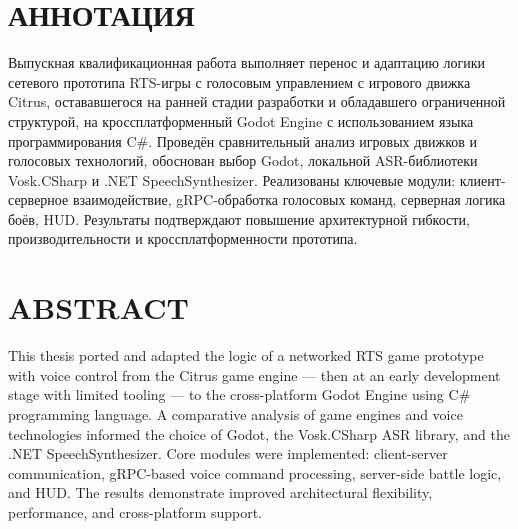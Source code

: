 \section*{АННОТАЦИЯ}

Выпускная квалификационная работа выполняет перенос и адаптацию логики сетевого прототипа RTS-игры с голосовым управлением с игрового движка Citrus, остававшегося на ранней стадии разработки и обладавшего ограниченной структурой, на кроссплатформенный Godot Engine с использованием языка программирования C\#. Проведён сравнительный анализ игровых движков и голосовых технологий, обоснован выбор Godot, локальной ASR-библиотеки Vosk.CSharp и .NET SpeechSynthesizer. Реализованы ключевые модули: клиент-серверное взаимодействие, gRPC-обработка голосовых команд, серверная логика боёв, HUD. Результаты подтверждают повышение архитектурной гибкости, производительности и кроссплатформенности прототипа.

\section*{ABSTRACT}

This thesis ported and adapted the logic of a networked RTS game prototype with voice control from the Citrus game engine — then at an early development stage with limited tooling — to the cross-platform Godot Engine using C\# programming language. A comparative analysis of game engines and voice technologies informed the choice of Godot, the Vosk.CSharp ASR library, and the .NET SpeechSynthesizer. Core modules were implemented: client-server communication, gRPC-based voice command processing, server-side battle logic, and HUD. The results demonstrate improved architectural flexibility, performance, and cross-platform support.